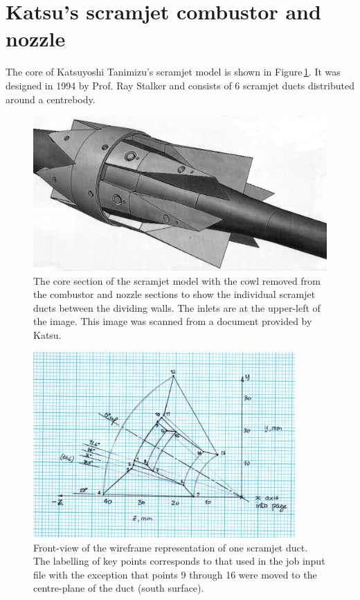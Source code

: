 \section{Katsu's scramjet combustor and nozzle}
\label{scram1-sec}
%
The core of Katsuyoshi Tanimizu's scramjet model is shown in 
Figure\,\ref{scram1-core-model-fig}.
It was designed in 1994 by Prof. Ray Stalker and consists of 6 scramjet 
ducts distributed around a centrebody.

\begin{figure}[htbp]
\begin{center}
\includegraphics[width=12cm]{../3D/scramjet-1/katsu-scramjet-model.jpg}
\end{center}
\caption{The core section of the scramjet model with the  
  cowl removed from the combustor and nozzle sections 
  to show the individual scramjet ducts between the dividing walls.
  The inlets are at the upper-left of the image.
  This image was scanned from a document provided by Katsu.}
\label{scram1-core-model-fig}
\end{figure}

\begin{figure}[htbp]
\begin{center}
\includegraphics[width=10cm]{../3D/scramjet-1/katsu-scramjet-front-view.jpg}
\end{center}
\caption{Front-view of the wireframe representation of one scramjet duct.
  The labelling of key points corresponds to that used in the job input file
  with the exception that points 9 through 16 were moved to the centre-plane
  of the duct (south surface).}
\label{scram1-front-view-fig}
\end{figure}

